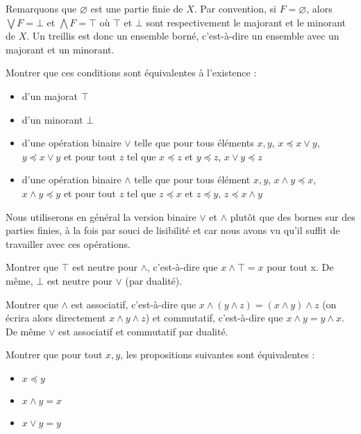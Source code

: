 \begin{rmk}
    Remarquons que $\varnothing$ est une partie finie de $X$. Par convention, si $F=\varnothing$, alors $\bigvee F = \bot$ et $\bigwedge F = \top$ où $\top$ et $\bot$ sont respectivement le majorant et le minorant de $X$. Un treillis est donc un ensemble borné, c'est-à-dire un ensemble avec un majorant et un minorant.
\end{rmk}

\begin{exo}
    Montrer que ces conditions sont équivalentes à l'existence :
    \begin{itemize}[label=$\bullet$]
    \item d'un majorat $\top$
    \item d'un minorant $\bot$
    \item d'une opération binaire $\vee$ telle que pour tous éléments $x,y$, $x\preceq x\vee y$, $y\preceq x\vee y$ et pour tout $z$ tel que $x\preceq z$ et $y\preceq z$, $x\vee y\preceq z$
    \item d'une opération binaire $\wedge$ telle que pour tous élément $x,y$, $x\wedge y\preceq x$, $x\wedge y\preceq y$ et pour tout $z$ tel que $z\preceq x$ et $z\preceq y$, $z\preceq x\wedge y$
    \end{itemize}
\end{exo}

Nous utiliserons en général la version binaire $\lor$ et $\land$ plutôt que des bornes sur des parties finies, à la fois par souci de lisibilité et car nous avons vu qu'il suffit de travailler avec ces opérations.

\begin{exo}
    Montrer que $\top$ est neutre pour $\wedge$, c'est-à-dire que $x\wedge \top = x$ pour tout x. De même, $\bot$ est neutre pour $\vee$ (par dualité).
\end{exo}

\begin{exo}
    Montrer que $\wedge$ est associatif, c'est-à-dire que $x\wedge (y\wedge z) = (x\wedge y)\wedge z$ (on écrira alors directement $x\wedge y \wedge z$) et commutatif, c'est-à-dire que $x\wedge y = y\wedge x$. De même $\vee$ est associatif et commutatif par dualité.
\end{exo}

\begin{exo}
    Montrer que pour tout $x,y$, les propositions suivantes sont équivalentes : 
    \begin{itemize}[label=$\bullet$]
        \item $x\preceq y$
        \item $x\wedge y = x$
        \item $x\vee y = y$
    \end{itemize}
\end{exo}


